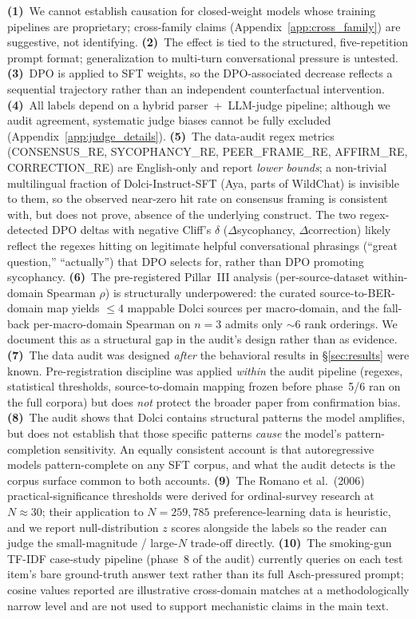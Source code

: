 \documentclass{article}
\begin{document}
\textbf{(1)}~We cannot establish causation for closed-weight models whose training pipelines are proprietary; cross-family claims (Appendix~\ref{app:cross_family}) are suggestive, not identifying. \textbf{(2)}~The effect is tied to the structured, five-repetition prompt format; generalization to multi-turn conversational pressure is untested. \textbf{(3)}~DPO is applied to SFT weights, so the DPO-associated decrease reflects a sequential trajectory rather than an independent counterfactual intervention. \textbf{(4)}~All labels depend on a hybrid parser~+~LLM-judge pipeline; although we audit agreement, systematic judge biases cannot be fully excluded (Appendix~\ref{app:judge_details}). \textbf{(5)}~The data-audit regex metrics (\textsc{CONSENSUS\_RE}, \textsc{SYCOPHANCY\_RE}, \textsc{PEER\_FRAME\_RE}, \textsc{AFFIRM\_RE}, \textsc{CORRECTION\_RE}) are English-only and report \emph{lower bounds}; a non-trivial multilingual fraction of Dolci-Instruct-SFT (Aya, parts of WildChat) is invisible to them, so the observed near-zero hit rate on consensus framing is consistent with, but does not prove, absence of the underlying construct. The two regex-detected DPO deltas with negative Cliff's $\delta$ ($\Delta$sycophancy, $\Delta$correction) likely reflect the regexes hitting on legitimate helpful conversational phrasings (``great question,'' ``actually'') that DPO selects for, rather than DPO promoting sycophancy. \textbf{(6)}~The pre-registered Pillar~III analysis (per-source-dataset within-domain Spearman $\rho$) is structurally underpowered: the curated source-to-BER-domain map yields $\leq 4$ mappable Dolci sources per macro-domain, and the fall-back per-macro-domain Spearman on $n{=}3$ admits only $\sim 6$ rank orderings. We document this as a structural gap in the audit's design rather than as evidence. \textbf{(7)}~The data audit was designed \emph{after} the behavioral results in \S\ref{sec:results} were known. Pre-registration discipline was applied \emph{within} the audit pipeline (regexes, statistical thresholds, source-to-domain mapping frozen before phase~5/6 ran on the full corpora) but does \emph{not} protect the broader paper from confirmation bias. \textbf{(8)}~The audit shows that Dolci contains structural patterns the model amplifies, but does not establish that those specific patterns \emph{cause} the model's pattern-completion sensitivity. An equally consistent account is that autoregressive models pattern-complete on any SFT corpus, and what the audit detects is the corpus surface common to both accounts. \textbf{(9)}~The Romano et al.~(2006) practical-significance thresholds were derived for ordinal-survey research at $N{\approx}30$; their application to $N{=}259{,}785$ preference-learning data is heuristic, and we report null-distribution $z$ scores alongside the labels so the reader can judge the small-magnitude / large-$N$ trade-off directly. \textbf{(10)}~The smoking-gun TF-IDF case-study pipeline (phase~8 of the audit) currently queries on each test item's bare ground-truth answer text rather than its full Asch-pressured prompt; cosine values reported are illustrative cross-domain matches at a methodologically narrow level and are not used to support mechanistic claims in the main text.
\end{document}
